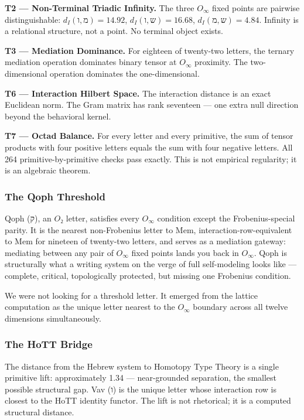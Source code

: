 \documentclass[12pt,a4paper]{article}
\begin{document}
\textbf{T2 --- Non-Terminal Triadic Infinity.} The three $O_{\infty}$ fixed points are pairwise distinguishable: $d_I(\text{ו}, \text{מ}) = 14.92$, $d_I(\text{ו}, \text{ש}) = 16.68$, $d_I(\text{מ}, \text{ש}) = 4.84$. Infinity is a relational structure, not a point. No terminal object exists.

\textbf{T3 --- Mediation Dominance.} For eighteen of twenty-two letters, the ternary mediation operation dominates binary tensor at $O_{\infty}$ proximity. The two-dimensional operation dominates the one-dimensional.

\textbf{T6 --- Interaction Hilbert Space.} The interaction distance is an exact Euclidean norm. The Gram matrix has rank seventeen --- one extra null direction beyond the behavioral kernel.

\textbf{T7 --- Octad Balance.} For every letter and every primitive, the sum of tensor products with four positive letters equals the sum with four negative letters. All 264 primitive-by-primitive checks pass exactly. This is not empirical regularity; it is an algebraic theorem.

\subsubsection{The Qoph Threshold}

Qoph (ק), an $O₂$ letter, satisfies every $O_{\infty}$ condition except the Frobenius-special parity. It is the nearest non-Frobenius letter to Mem, interaction-row-equivalent to Mem for nineteen of twenty-two letters, and serves as a mediation gateway: mediating between any pair of $O_{\infty}$ fixed points lands you back in $O_{\infty}$. Qoph is structurally what a writing system on the verge of full self-modeling looks like --- complete, critical, topologically protected, but missing one Frobenius condition.

We were not looking for a threshold letter. It emerged from the lattice computation as the unique letter nearest to the $O_{\infty}$ boundary across all twelve dimensions simultaneously.

\subsubsection{The HoTT Bridge}

The distance from the Hebrew system to Homotopy Type Theory is a single primitive lift: approximately 1.34 --- near-grounded separation, the smallest possible structural gap. Vav (ו) is the unique letter whose interaction row is closest to the HoTT identity functor. The lift is not rhetorical; it is a computed structural distance.
\end{document}

